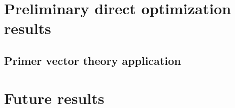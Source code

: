 \section{Preliminary direct optimization results}

\subsection{Primer vector theory application}

\section{Future results}